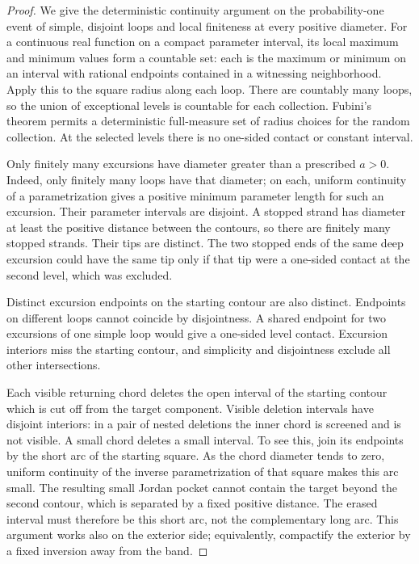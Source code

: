 \begin{proof}
We give the deterministic continuity argument on the probability-one
event of simple, disjoint loops and local finiteness at every positive
diameter.  For a continuous real function on a compact parameter
interval, its local maximum and minimum values form a countable set:
each is the maximum or minimum on an interval with rational endpoints
contained in a witnessing neighborhood.  Apply this to the square
radius along each loop.  There are countably many loops, so the union
of exceptional levels is countable for each collection.  Fubini's
theorem permits a deterministic full-measure set of radius choices for
the random collection.  At the selected levels there is no one-sided
contact or constant interval.

Only finitely many excursions have diameter greater than a prescribed
$a>0$.  Indeed, only finitely many loops have that diameter; on each,
uniform continuity of a parametrization gives a positive minimum
parameter length for such an excursion.  Their parameter intervals
are disjoint.  A stopped strand has diameter at least the positive
distance between the contours, so there are finitely many stopped
strands.  Their tips are distinct.  The two stopped ends of the same
deep excursion could have the same tip only if that tip were a
one-sided contact at the second level, which was excluded.

Distinct excursion endpoints on the starting contour are also
distinct.  Endpoints on different loops cannot coincide by
disjointness.  A shared endpoint for two excursions of one simple
loop would give a one-sided level contact.  Excursion interiors miss
the starting contour, and simplicity and disjointness exclude all
other intersections.

Each visible returning chord deletes the open interval of the starting
contour which is cut off from the target component.  Visible deletion
intervals have disjoint interiors: in a pair of nested deletions the
inner chord is screened and is not visible.  A small chord deletes a
small interval.  To see this, join its endpoints by the short arc of
the starting square.  As the chord diameter tends to zero, uniform
continuity of the inverse parametrization of that square makes this
arc small.  The resulting small Jordan pocket cannot contain the
target beyond the second contour, which is separated by a fixed
positive distance.  The erased interval must therefore be this short
arc, not the complementary long arc.  This argument works also on
the exterior side; equivalently, compactify the exterior by a fixed
inversion away from the band.


\end{proof}
